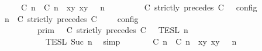\begin{isabellebody}
\ \ \ \ {\isacharequal}\ {\isasymlbrakk}\ {\isacharparenleft}{\isacharparenleft}{\isasymlceil}{\isacharhash}\isactrlsup {\isasymle}\ C\ n{\isacharcomma}\ {\isacharhash}\isactrlsup {\isacharless}\ C\ n{\isasymrceil}\ {\isasymin}\ {\isacharparenleft}{\isasymlambda}{\isacharparenleft}x{\isacharcomma}y{\isacharparenright}{\isachardot}\ x{\isasymle}y{\isacharparenright}{\isacharparenright}\ {\isacharhash}\ {\isasymGamma}{\isacharparenright}{\isacharcomma}\ n\isanewline
\ \ \ \ \ \ {\isasymTurnstile}\ {\isasymPsi}\ {\isasymtriangleright}\ {\isacharparenleft}{\isacharparenleft}C\ strictly\ precedes\ C\ {\isacharhash}\ {\isasymPhi}{\isacharparenright}\ {\isasymrbrakk}\isactrlsub c\isactrlsub o\isactrlsub n\isactrlsub f\isactrlsub i\isactrlsub g{\isacartoucheclose}\isanewline
%
\isadelimproof
%
\endisadelimproof
%
\isatagproof
{}\isamarkupfalse%
\ {\isacharminus}\isanewline
\ \ \isamarkupfalse%
\ {\isacartoucheopen}{\isasymlbrakk}\ {\isasymGamma}{\isacharcomma}\ n\ {\isasymTurnstile}\ {\isacharparenleft}C\ strictly\ precedes\ C\ {\isacharhash}\ {\isasymPsi}\ {\isasymtriangleright}\ {\isasymPhi}\ {\isasymrbrakk}\isactrlsub c\isactrlsub o\isactrlsub n\isactrlsub f\isactrlsub i\isactrlsub g\isanewline
\ \ \ \ \ \ \ \ {\isacharequal}\ {\isasymlbrakk}{\isasymlbrakk}\ {\isasymGamma}\ {\isasymrbrakk}{\isasymrbrakk}\isactrlsub p\isactrlsub r\isactrlsub i\isactrlsub m\ {\isasyminter}\ {\isasymlbrakk}{\isasymlbrakk}\ {\isacharparenleft}C\ strictly\ precedes\ C\ {\isacharhash}\ {\isasymPsi}\ {\isasymrbrakk}{\isasymrbrakk}\isactrlsub T\isactrlsub E\isactrlsub S\isactrlsub L\isactrlbsup {\isasymge}\ n\isactrlesup \isanewline
\ \ \ \ \ \ \ \ \ \ {\isasyminter}\ {\isasymlbrakk}{\isasymlbrakk}\ {\isasymPhi}\ {\isasymrbrakk}{\isasymrbrakk}\isactrlsub T\isactrlsub E\isactrlsub S\isactrlsub L\isactrlbsup {\isasymge}\ Suc\ n\isactrlesup {\isacartoucheclose}\ \isamarkupfalse%
\ simp\isanewline
\ \ \isamarkupfalse%
\ \isamarkupfalse%
\ {\isacartoucheopen}{\isasymlbrakk}\ {\isacharparenleft}{\isacharparenleft}{\isasymlceil}{\isacharhash}\isactrlsup {\isasymle}\ C\ n{\isacharcomma}\ {\isacharhash}\isactrlsup {\isacharless}\ C\ n{\isasymrceil}\ {\isasymin}\ {\isacharparenleft}{\isasymlambda}{\isacharparenleft}x{\isacharcomma}y{\isacharparenright}{\isachardot}\ x{\isasymle}y{\isacharparenright}{\isacharparenright}\ {\isacharhash}\ {\isasymGamma}{\isacharparenright}{\isacharcomma}\ n\isanewline

\end{isabellebody}
